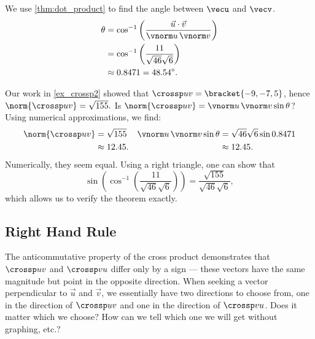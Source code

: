 {We use \autoref{thm:dot_product} to find the angle between $\vecu$ and $\vecv$. 
\begin{align*}
\theta &= \cos^{-1}\left(\frac{\vec u\cdot\vec v}{\vnorm u\, \vnorm v}\right) \\
			&= \cos^{-1}\left(\frac{11}{\sqrt{46}\sqrt{6}}\right)\\
			&\approx 0.8471 = 48.54^\circ.
\end{align*}

Our work in \autoref{ex_crossp2} showed that $\crossp uv = \bracket{-9,-7,5}$, hence $\norm{\crossp uv} = \sqrt{155}.$ Is $\norm{\crossp uv} = \vnorm u\, \vnorm v\sin\theta$? Using numerical approximations, we find:
\begin{align*}
\norm{\crossp uv}
 &=\sqrt{155}  & \vnorm u\,\vnorm v \sin\theta & = \sqrt{46}\sqrt{6}\sin 0.8471\\
 &\approx 12.45. & &\approx 12.45.
\end{align*}
Numerically, they seem equal. Using a right triangle, one can show that 
\[\sin\left(\cos^{-1}\left(\frac{11}{\sqrt{46}\sqrt{6}}\right)\right) = \frac{\sqrt{155}}{\sqrt{46}\sqrt{6}},\]
which allows us to verify the theorem exactly.}

\subsection{Right Hand Rule}

The anticommutative property of the cross product demonstrates that $\crossp uv$ and $\crossp vu$ differ only by a sign --- these vectors have the same magnitude but point in the opposite direction. When seeking a vector perpendicular to $\vec u$ and $\vec v$, we essentially have two directions to choose from, one in the direction of $\crossp uv$ and one in the direction of $\crossp vu$. Does it matter which we choose? How can we tell which one we will get without graphing, etc.?


